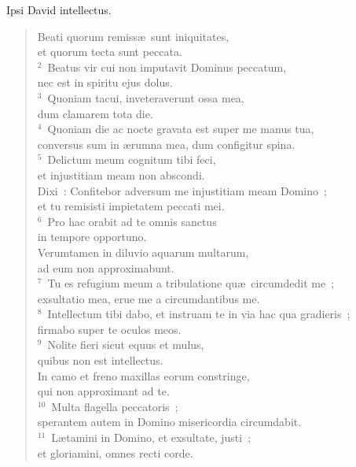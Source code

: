 \bchapter
\lettrine[lines=3,image=true,loversize=0.05,lraise=-0.03]{I}{}psi David intellectus. \begin{flushleft}\begin{verse}\vspace{6pt}Beati quorum remiss\ae\ sunt iniquitates,\\ et quorum tecta sunt peccata.\\
${}^{2}$~Beatus vir cui non imputavit Dominus peccatum,\\ nec est in spiritu ejus dolus.\\
${}^{3}$~Quoniam tacui, inveteraverunt ossa mea,\\ dum clamarem tota die.\\
${}^{4}$~Quoniam die ac nocte gravata est super me manus tua,\\ conversus sum in \ae rumna mea, dum configitur spina.\\
${}^{5}$~Delictum meum cognitum tibi feci,\\ et injustitiam meam non abscondi.\\ Dixi~: Confitebor adversum me injustitiam meam Domino~;\\ et tu remisisti impietatem peccati mei.\\
${}^{6}$~Pro hac orabit ad te omnis sanctus\\ in tempore opportuno.\\ Verumtamen in diluvio aquarum multarum,\\ ad eum non approximabunt.\\
${}^{7}$~Tu es refugium meum a tribulatione qu\ae\ circumdedit me~;\\ exsultatio mea, erue me a circumdantibus me.\\
${}^{8}$~Intellectum tibi dabo, et instruam te in via hac qua gradieris~;\\ firmabo super te oculos meos.\\
${}^{9}$~Nolite fieri sicut equus et mulus,\\ quibus non est intellectus.\\ In camo et freno maxillas eorum constringe,\\ qui non approximant ad te.\\
${}^{10}$~Multa flagella peccatoris~;\\ sperantem autem in Domino misericordia circumdabit.\\
${}^{11}$~L\ae tamini in Domino, et exsultate, justi~;\\ et gloriamini, omnes recti corde.\end{verse}\end{flushleft}



